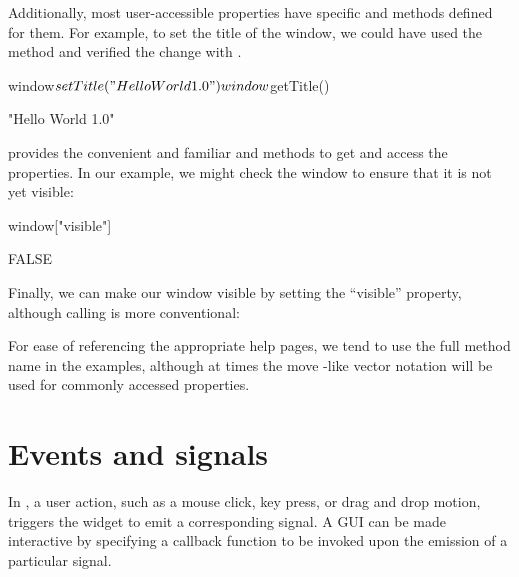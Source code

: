 Additionally, most user-accessible properties have specific  and
 methods defined for them. For example, to set the title of
the window, we could have used the  method
and verified the change with .
\begin{Schunk}
\begin{Sinput}
 window$setTitle("Hello World 1.0")
 window$getTitle()
\end{Sinput}
\begin{Soutput}
[1] "Hello World 1.0"
\end{Soutput}
\end{Schunk}

 provides the convenient and familiar \code{[} and
\code{[$<$-} methods to get and access the properties. In our example,
we might check the window to ensure that it is not yet visible:
\begin{Schunk}
\begin{Sinput}
 window["visible"]
\end{Sinput}
\begin{Soutput}
[1] FALSE
\end{Soutput}
\end{Schunk}
Finally, we can make our window visible by setting the ``visible'' property,
although calling  is more conventional:
\begin{Schunk}
\end{Schunk}

For ease of referencing the appropriate help pages, we tend to use the
full method name in the examples, although at times the move \R-like
vector notation will be used for commonly accessed properties.


\section{Events and signals}

In , a user action, such as a mouse click, key press, or
drag and drop motion, triggers the widget to emit a corresponding
signal.  A GUI can be made interactive by specifying a callback
function to be invoked upon the emission of a particular signal.


